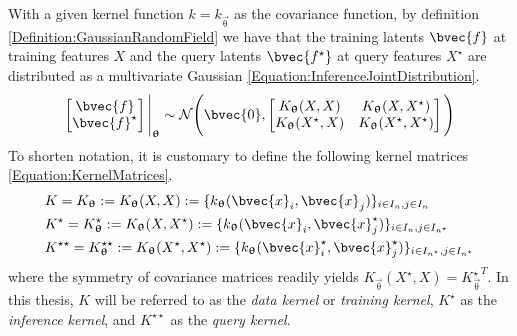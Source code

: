 				With a given kernel function $k = k_{\vec{\uptheta}}$ as the covariance function, by definition \ref{Definition:GaussianRandomField} we have that the training latents $\bvec{f}$ at training features $X$ and the query latents $\bvec{f^{\star}}$ at query features $X^{\star}$ are distributed as a multivariate Gaussian \eqref{Equation:InferenceJointDistribution}. \begin{equation}
					\begin{bmatrix}
						\bvec{f} \\ \bvec{f}^{\star}
					\end{bmatrix} \Bigg|_{\vec{\uptheta}}
					\sim \mathcal{N}\Bigg(\bvec{0}, \begin{bmatrix}
														K_{\vec{\uptheta}}(X, X) & K_{\vec{\uptheta}}(X, X^{\star}) \\
														K_{\vec{\uptheta}}(X^{\star}, X) & K_{\vec{\uptheta}}(X^{\star}, X^{\star}) \\
													\end{bmatrix}  \Bigg)
				\label{Equation:InferenceJointDistribution}
				\end{equation} To shorten notation, it is customary to define the following kernel matrices \eqref{Equation:KernelMatrices}. \begin{equation}
					\begin{aligned}
						& K = K_{\vec{\uptheta}} := K_{\vec{\uptheta}}(X, X) := \{k_{\vec{\uptheta}}(\bvec{x}_{i}, \bvec{x}_{j})\}_{i \in I_{n}, j \in I_{n}} \\
						& K^{\star} = K_{\vec{\uptheta}}^{\star} := K_{\vec{\uptheta}}(X, X^{\star}) := \{k_{\vec{\uptheta}}(\bvec{x}_{i}, \bvec{x}^{\star}_{j})\}_{i \in I_{n}, j \in I_{n^{\star}}} \\
						& K^{\star \star} = K_{\vec{\uptheta}}^{\star \star} := K_{\vec{\uptheta}}(X^{\star}, X^{\star}) := \{k_{\vec{\uptheta}}(\bvec{x}^{\star}_{i}, \bvec{x}^{\star}_{j})\}_{i \in I_{n^{\star}}, j \in I_{n^{\star}}}
					\end{aligned}
				\label{Equation:KernelMatrices}
				\end{equation} where the symmetry of covariance matrices readily yields $K_{\vec{\uptheta}}(X^{\star}, X) = {K_{\vec{\uptheta}}^{\star}}^{T}$. In this thesis, $K$ will be referred to as the \textit{data kernel} or \textit{training kernel}, $K^{\star}$ as the \textit{inference kernel}, and $K^{\star \star}$ as the \textit{query kernel}.
					
